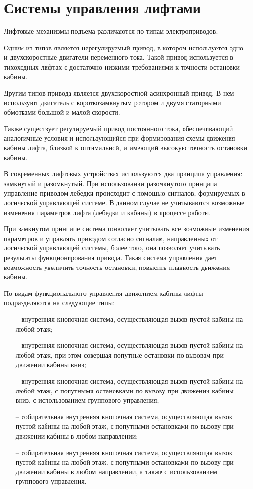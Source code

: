 \section{Системы управления лифтами}

	Лифтовые механизмы подъема различаются по типам электроприводов.

	Одним из типов является нерегулируемый привод, в котором используется одно- и двухскоростные двигатели
		переменного тока. Такой привод используется в тихоходных лифтах с достаточно низкими требованиями
		к точности остановки кабины. 

	Другим типов привода является двухскоростной асинхронный привод.
		В нем используют двигатель с короткозамкнутым ротором и двумя статорными обмотками большой и малой скорости. 

	Также существует регулируемый привод постоянного тока, обеспечивающий аналогичные условия и использующийся
		при формирования схемы движения кабины лифта, близкой к оптимальной, и имеющий высокую точность остановки кабины.

	В современных лифтовых устройствах используются два принципа управления: замкнутый и разомкнутый.
		При использовании разомкнутого принципа управление приводом лебедки происходит с помощью сигналов,
		формируемых в логической управляющей системе. В данном случае не учитываются возможные изменения
		параметров лифта (лебедки и кабины) в процессе работы.

	При замкнутом принципе система позволяет учитывать все возможные изменения параметров и управлять приводом
		согласно сигналам, направленных от логической управляющей системы, более того, она позволяет учитывать
		результаты функционирования привода. Такая система управления дает возможность увеличить точность остановки,
		повысить плавность движения кабины.

	По видам функционального управления движением кабины лифты подразделяются на следующие типы:
		\begin{itemize}
			\item[--] внутренняя кнопочная система, осуществляющая вызов пустой кабины на любой этаж;
			\item[--] внутренняя кнопочная система, осуществляющая вызов пустой кабины на любой этаж,
				при этом совершая попутные остановки по вызовам при движении кабины вниз;
			\item[--] внутренняя кнопочная система, осуществляющая вызов пустой кабины на любой этаж,
				с попутными остановками по вызову при движении кабины вниз, с использованием группового управления;
			\item[--] собирательная внутренняя кнопочная система, осуществляющая вызов пустой кабины на любой этаж,
				с попутными остановками по вызову при движении кабины в любом направлении;
			\item[--] собирательная внутренняя кнопочная система, осуществляющая вызов пустой кабины на любой этаж,
				с попутными остановками по вызову при движении кабины  в любом направлении,
				а также с использованием группового управления.
		\end{itemize}

